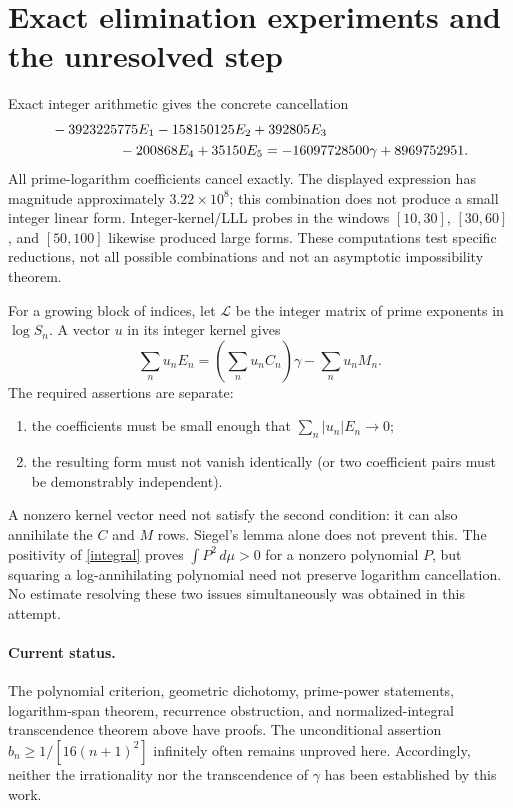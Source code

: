 \documentclass[11pt,a4paper]{article}
\theoremstyle{remark}\newtheorem{remark}[theorem]{Remark}
\begin{document}
\section{Exact elimination experiments and the unresolved step}
Exact integer arithmetic gives the concrete cancellation
\begin{align*}
 &-3923225775E_1-158150125E_2+392805E_3\\
 &\hspace{17mm}-200868E_4+35150E_5
 =-16097728500\gamma+8969752951.
\end{align*}
All prime-logarithm coefficients cancel exactly. The displayed expression
has magnitude approximately $3.22\times10^8$; this combination does not
produce a small integer linear form. Integer-kernel/LLL probes in the
windows $[10,30]$, $[30,60]$, and $[50,100]$ likewise produced large forms.
These computations test specific reductions, not all possible combinations
and not an asymptotic impossibility theorem.

For a growing block of indices, let $\mathcal L$ be the integer matrix of
prime exponents in $\log S_n$. A vector $u$ in its integer kernel gives
\[
 \sum_nu_nE_n=\left(\sum_nu_nC_n\right)\gamma-\sum_nu_nM_n.
\]
The required assertions are separate:
\begin{enumerate}
\item the coefficients must be small enough that $\sum_n|u_n|E_n\to0$;
\item the resulting form must not vanish identically (or two coefficient
      pairs must be demonstrably independent).
\end{enumerate}
A nonzero kernel vector need not satisfy the second condition: it can also
annihilate the $C$ and $M$ rows. Siegel's lemma alone does not prevent this.
The positivity of \eqref{integral} proves $\int P^2\,d\mu>0$ for a nonzero
polynomial $P$, but squaring a log-annihilating polynomial need not preserve
logarithm cancellation. No estimate resolving these two issues simultaneously
was obtained in this attempt.

\paragraph{Current status.}
The polynomial criterion, geometric dichotomy, prime-power statements,
logarithm-span theorem, recurrence obstruction, and normalized-integral
transcendence theorem above have proofs. The unconditional assertion
$b_n\ge1/[16(n+1)^2]$ infinitely often remains unproved here.
Accordingly, neither the irrationality nor the transcendence of $\gamma$
has been established by this work.
\end{document}
